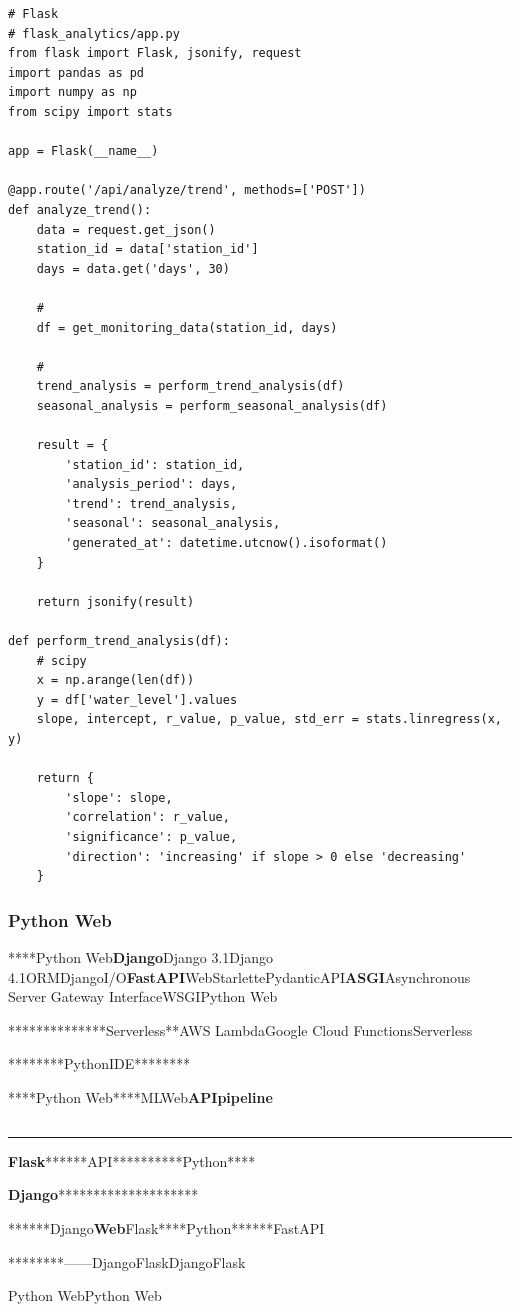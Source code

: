 \begin{verbatim}
# Flask
# flask_analytics/app.py
from flask import Flask, jsonify, request
import pandas as pd
import numpy as np
from scipy import stats

app = Flask(__name__)

@app.route('/api/analyze/trend', methods=['POST'])
def analyze_trend():
    data = request.get_json()
    station_id = data['station_id']
    days = data.get('days', 30)
    
    # 
    df = get_monitoring_data(station_id, days)
    
    # 
    trend_analysis = perform_trend_analysis(df)
    seasonal_analysis = perform_seasonal_analysis(df)
    
    result = {
        'station_id': station_id,
        'analysis_period': days,
        'trend': trend_analysis,
        'seasonal': seasonal_analysis,
        'generated_at': datetime.utcnow().isoformat()
    }
    
    return jsonify(result)

def perform_trend_analysis(df):
    # scipy
    x = np.arange(len(df))
    y = df['water_level'].values
    slope, intercept, r_value, p_value, std_err = stats.linregress(x, y)
    
    return {
        'slope': slope,
        'correlation': r_value,
        'significance': p_value,
        'direction': 'increasing' if slope > 0 else 'decreasing'
    }
\end{verbatim}

\subsubsection{Python Web}\label{python-web-1}

****Python Web\textbf{Django}Django 3.1Django
4.1ORMDjangoI/O\textbf{FastAPI}WebStarlettePydanticAPI\textbf{ASGI}Asynchronous
Server Gateway InterfaceWSGIPython Web

**************Serverless**AWS LambdaGoogle Cloud FunctionsServerless

********PythonIDE********

****Python Web****MLWeb\textbf{APIpipeline}

\subsection{}\label{section-35}

\begin{center}\rule{0.5\linewidth}{0.5pt}\end{center}

\textbf{Flask}******API**********Python****

\textbf{Django}********************

******Django\textbf{Web}Flask****Python******FastAPI

********------DjangoFlaskDjangoFlask

Python WebPython Web